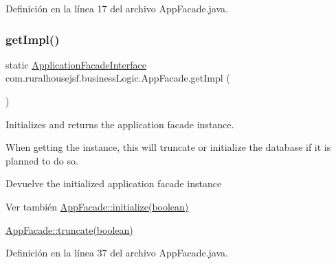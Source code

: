 Definición en la línea 17 del archivo App\+Facade.\+java.

\mbox{\label{classcom_1_1ruralhousejsf_1_1business_logic_1_1_app_facade_a029bcceee98b9070b9f80abc54db45d6}} 
\subsubsection{\texorpdfstring{getImpl()}{getImpl()}\hspace{0.1cm}{\footnotesize\ttfamily [1/3]}}
{\footnotesize\ttfamily static \mbox{\hyperlink{interfacecom_1_1ruralhousejsf_1_1business_logic_1_1_application_facade_interface}{Application\+Facade\+Interface}} com.\+ruralhousejsf.\+business\+Logic.\+App\+Facade.\+get\+Impl (\begin{DoxyParamCaption}{ }\end{DoxyParamCaption})\hspace{0.3cm}{\ttfamily [static]}}



Initializes and returns the application facade instance. 

When getting the instance, this will truncate or initialize the database if it is planned to do so.

\begin{DoxyReturn}{Devuelve}
the initialized application facade instance
\end{DoxyReturn}
\begin{DoxySeeAlso}{Ver también}
\mbox{\hyperlink{classcom_1_1ruralhousejsf_1_1business_logic_1_1_app_facade_a48252ec119a6bb16f5353df6ec6eff54}{App\+Facade\+::initialize(boolean)}} 

\mbox{\hyperlink{classcom_1_1ruralhousejsf_1_1business_logic_1_1_app_facade_a98aed1ed8a03c6a92e15121fed4eb452}{App\+Facade\+::truncate(boolean)}} 
\end{DoxySeeAlso}


Definición en la línea 37 del archivo App\+Facade.\+java.

\mbox{\label{classcom_1_1ruralhousejsf_1_1business_logic_1_1_app_facade_aa4bf7166aae19a2d640fd6ab8a0fff96}} 
